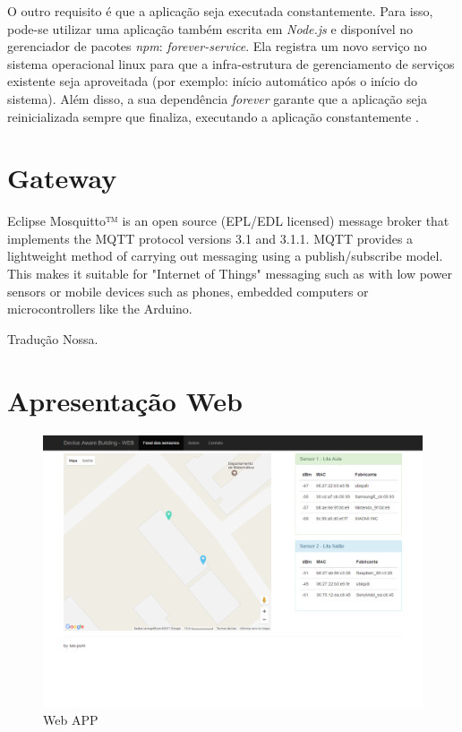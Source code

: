 O outro requisito é que a aplicação seja executada constantemente. Para isso,
pode-se utilizar uma aplicação também escrita em \emph{Node.js} e disponível no
gerenciador de pacotes \emph{npm}: \emph{forever-service}. Ela registra um novo serviço no sistema operacional
linux para que a infra-estrutura de gerenciamento de serviços  existente seja
aproveitada (por exemplo: início automático após o início do sistema). Além disso, a sua dependência
\emph{forever} garante que a aplicação seja reinicializada sempre que finaliza,
executando a aplicação constantemente \cite{forever-service}.


\section{Gateway}
\label{sec:app-gw}

\begin{citacao}

	Eclipse Mosquitto™ is an open source (EPL/EDL licensed) message broker that
	implements the MQTT protocol versions 3.1 and 3.1.1. MQTT provides a lightweight
	method of carrying out messaging using a publish/subscribe model. This makes it
	suitable for "Internet of Things" messaging such as with low power sensors or
	mobile devices such as phones, embedded computers or microcontrollers like the
	Arduino. \

	 Tradução Nossa.
\end{citacao}


\section{Apresentação Web}
\label{sec:app-web}


\begin{figure}[htb]
	\caption{\label{fig-web-app}Web APP}
	\begin{center}
		\includegraphics[width=1\textwidth]{050-construcao/web-app.png}
	\end{center}
\end{figure}
